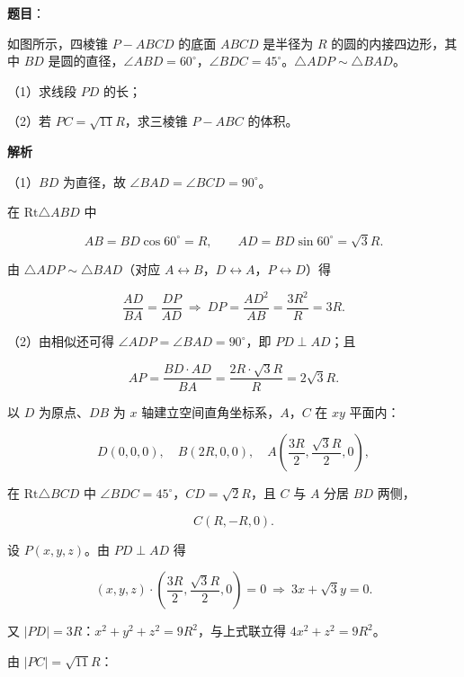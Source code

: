 \begin{answer}

\textbf{题目}：

如图所示，四棱锥 $P-ABCD$ 的底面 $ABCD$ 是半径为 $R$ 的圆的内接四边形，其中 $BD$ 是圆的直径，$\angle ABD=60^\circ$，$\angle BDC=45^\circ$。$\triangle ADP\sim\triangle BAD$。

（1）求线段 $PD$ 的长；

（2）若 $PC=\sqrt{11}R$，求三棱锥 $P-ABC$ 的体积。
\nopagebreak[4]
\begin{center}\end{center}
\nopagebreak[4]
\textbf{解析}

（1）$BD$ 为直径，故 $\angle BAD=\angle BCD=90^\circ$。

在 $\mathrm{Rt}\triangle ABD$ 中

\nopagebreak[4]
\[AB=BD\cos60^\circ=R,\qquad AD=BD\sin60^\circ=\sqrt3R.\]

由 $\triangle ADP\sim\triangle BAD$（对应 $A\leftrightarrow B$，$D\leftrightarrow A$，$P\leftrightarrow D$）得

\nopagebreak[4]
\[\frac{AD}{BA}=\frac{DP}{AD}\ \Longrightarrow\ DP=\frac{AD^2}{AB}=\frac{3R^2}{R}=3R.\]

（2）由相似还可得 $\angle ADP=\angle BAD=90^\circ$，即 $PD\perp AD$；且

\nopagebreak[4]
\[AP=\frac{BD\cdot AD}{BA}=\frac{2R\cdot\sqrt3R}{R}=2\sqrt3R.\]

以 $D$ 为原点、$DB$ 为 $x$ 轴建立空间直角坐标系，$A$，$C$ 在 $xy$ 平面内：

\nopagebreak[4]
\[D(0,0,0),\quad B(2R,0,0),\quad A\left(\frac{3R}2,\frac{\sqrt3R}2,0\right),\]

在 $\mathrm{Rt}\triangle BCD$ 中 $\angle BDC=45^\circ$，$CD=\sqrt2R$，且 $C$ 与 $A$ 分居 $BD$ 两侧，

\nopagebreak[4]
\[C(R,-R,0).\]

设 $P(x,y,z)$。由 $PD\perp AD$ 得

\nopagebreak[4]
\[\left(x,y,z\right)\cdot\left(\frac{3R}2,\frac{\sqrt3R}2,0\right)=0\ \Longrightarrow\ 3x+\sqrt3y=0.\]

又 $|PD|=3R$：$x^2+y^2+z^2=9R^2$，与上式联立得 $4x^2+z^2=9R^2$。

由 $|PC|=\sqrt{11}R$：


\end{answer}
